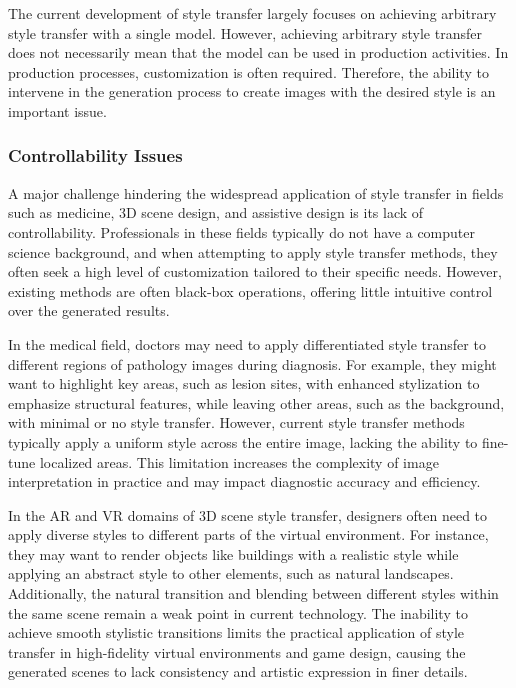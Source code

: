 \documentclass[preprint,12pt]{elsarticle}
\begin{document}
The current development of style transfer largely focuses on achieving arbitrary style transfer with a single model. However, achieving arbitrary style transfer does not necessarily mean that the model can be used in production activities. In production processes, customization is often required. Therefore, the ability to intervene in the generation process to create images with the desired style is an important issue.

\subsubsection{Controllability Issues}

A major challenge hindering the widespread application of style transfer in fields such as medicine, 3D scene design, and assistive design is its lack of controllability. Professionals in these fields typically do not have a computer science background, and when attempting to apply style transfer methods, they often seek a high level of customization tailored to their specific needs. However, existing methods are often black-box operations, offering little intuitive control over the generated results.

In the medical field\citep{126ma2019neural}, doctors may need to apply differentiated style transfer to different regions of pathology images during diagnosis. For example, they might want to highlight key areas, such as lesion sites, with enhanced stylization to emphasize structural features, while leaving other areas, such as the background, with minimal or no style transfer. However, current style transfer methods typically apply a uniform style across the entire image, lacking the ability to fine-tune localized areas. This limitation increases the complexity of image interpretation in practice and may impact diagnostic accuracy and efficiency.

In the AR and VR domains of 3D scene style transfer\citep{87huang2021learning,89yin20213dstylenet,90chiang2022stylizing,93huang2022stylizednerf,86hollein2022stylemesh,117gao2023clip3dstyler,111he2025freditor}, designers often need to apply diverse styles to different parts of the virtual environment. For instance, they may want to render objects like buildings with a realistic style while applying an abstract style to other elements, such as natural landscapes. Additionally, the natural transition and blending between different styles within the same scene remain a weak point in current technology. The inability to achieve smooth stylistic transitions limits the practical application of style transfer in high-fidelity virtual environments and game design, causing the generated scenes to lack consistency and artistic expression in finer details.
\end{document}
